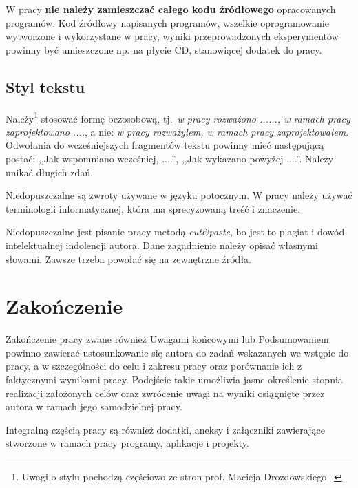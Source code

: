 W pracy \textbf{nie należy zamieszczać całego kodu źródłowego} opracowanych programów. Kod źródłowy napisanych
programów, wszelkie oprogramowanie wytworzone i wykorzystane w pracy, wyniki przeprowadzonych
eksperymentów powinny być umieszczone np. na płycie CD, stanowiącej dodatek do pracy.

\section*{Styl tekstu}

Należy\footnote{Uwagi o stylu pochodzą częściowo ze stron prof. Macieja Drozdowskiego~\cite{Drozdowski2006}.} 
stosować formę bezosobową, tj.~\emph{w pracy rozważono ......, 
w ramach pracy zaprojektowano ....}, a nie: \emph{w pracy rozważyłem, w ramach pracy zaprojektowałem}. 
Odwołania do wcześniejszych fragmentów tekstu powinny mieć następującą postać: ,,Jak wspomniano wcześniej, ....'', 
,,Jak wykazano powyżej ....''. Należy unikać długich zdań. 

Niedopuszczalne są zwroty używane w języku potocznym. W pracy należy używać terminologii informatycznej, która ma 
sprecyzowaną treść i znaczenie. 

Niedopuszczalne jest pisanie pracy metodą \emph{cut\&paste}, bo jest to plagiat i dowód intelektualnej indolencji autora.
Dane zagadnienie należy opisać własnymi słowami. Zawsze trzeba powołać się na zewnętrzne źródła. 


\chapter{Zakończenie}

Zakończenie pracy zwane również Uwagami końcowymi lub Podsumowaniem powinno zawierać ustosunkowanie
się autora do zadań wskazanych we wstępie do pracy, a w szczególności do celu i zakresu pracy oraz
porównanie ich z faktycznymi wynikami pracy. Podejście takie umożliwia jasne określenie stopnia
realizacji założonych celów oraz zwrócenie uwagi na wyniki osiągnięte przez autora w ramach jego
samodzielnej pracy.

Integralną częścią pracy są również dodatki, aneksy i załączniki zawierające stworzone w ramach pracy programy, aplikacje i projekty.



